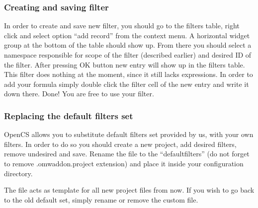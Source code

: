 \subsubsection{Creating and saving filter}
In order to create and save new filter, you should go to the filters table, right click and select option ``add record'' from the context menu.
A horizontal widget group at the bottom of the table should show up. From there you should select a namespace responsible for scope of
the filter (described earlier) and desired ID of the filter. After pressing OK button new entry will show up in the filters table. This filter
does nothing at the moment, since it still lacks expressions. In order to add your formula simply double click the filter cell of the new entry
and write it down there.
Done! You are free to use your filter.

\subsubsection{Replacing the default filters set}
OpenCS allows you to substitute default filters set provided by us, with your own filters. In order to do so you should create a new project,
add desired filters, remove undesired and save. Rename the file to the ``defaultfilters'' (do not forget to remove .omwaddon.project extension)
and place it inside your configuration directory.

The file acts as template for all new project files from now. If you wish to go back to the old default set, simply rename or remove the custom file.
